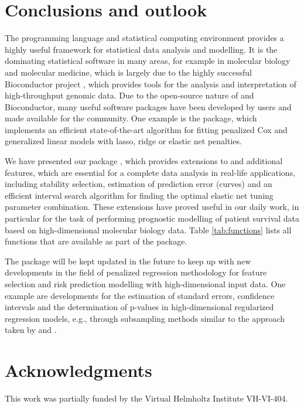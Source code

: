 \documentclass[]{jss}
\begin{document}
\section{Conclusions and outlook}
The programming language and statistical computing environment  provides a highly useful framework for statistical data analysis and modelling. It is the dominating statistical software in many areas, for example in molecular biology and molecular medicine, which is largely due to the highly successful Bioconductor project \citep{Bioconductor}, which provides tools for the analysis and interpretation of high-throughput genomic data. Due to the open-source nature of  and Bioconductor, many useful software packages have been developed by  users and made available for the  community. One example is the  package, which  implements an efficient state-of-the-art algorithm for fitting penalized Cox and generalized linear models with lasso, ridge or elastic net penalties.

We have presented our  package , which provides extensions to  and additional features, which are essential for a complete data analysis in real-life applications, including stability selection, estimation of prediction error (curves) and an efficient interval search algorithm for finding the optimal elastic net tuning parameter combination. These extensions have proved useful in our daily work, in particular for the task of performing prognostic modelling of patient survival data based on high-dimensional molecular biology data. Table \ref{tab:functions} lists all functions that are available as part of the  package.

The  package will be kept updated in the future to keep up with new developments in the field of penalized regression methodology for feature selection and risk prediction modelling with high-dimensional input data. One example are developments for the estimation of standard errors, confidence intervals and the determination of p-values in high-dimensional regularized regression models, e.g., through subsampling methods similar to the approach taken by \citet{wasserman2009} and \citet{MMB2009}.

\section*{Acknowledgments}

This work was partially funded by the Virtual Helmholtz Institute VH-VI-404.



\end{document}
